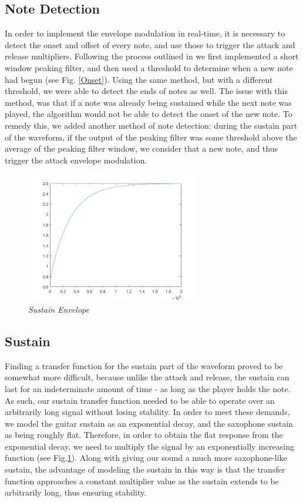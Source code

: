 \documentclass[twoside,a4paper]{article}
\begin{document}
\subsection{Note Detection}
In order to implement the envelope modulation in real-time, it is necessary to detect
the onset and offset of every note, and use those to trigger the attack
and release multipliers. Following the process outlined in \cite{NoteOnset}
we first implemented a short window peaking filter, and then used a threshold
to determine when a new note had begun (see Fig. \ref{Onset}). Using the same method,
but with a different threshold, we were able to detect the ends of notes as well.
The issue with this method, was that if a note was already being sustained while
the next note was played, the algorithm would not be able to detect the onset of
the new note. To remedy this, we added another method of note detection: during
the sustain part of the waveform, if the output of the peaking filter was some
threshold above the average of the peaking filter window, we consider that a new
note, and thus trigger the attack envelope modulation.

\begin{figure}[ht]
  \includegraphics[width=3in]{Pictures/Sustain_Env.png}
  \centering
  \caption{\label{Sustain} {\it Sustain Envelope}}
  \centering
  \end{figure}

\subsection{Sustain}
Finding a transfer function for the sustain part of the waveform proved
to be somewhat more difficult, because unlike the attack and release,
the sustain can last for an indeterminate amount of time - as long as
the player holds the note. As such, our sustain transfer function needed
to be able to operate over an arbitrarily long signal without losing
stability. In order to meet these demands, we model the guitar sustain
as an exponential decay, and the saxophone sustain as being roughly flat.
Therefore, in order to obtain the flat response from the exponential decay,
we need to multiply the signal by an exponentially increasing function (see Fig.\ref{Sustain}).
Along with giving our sound a much more saxophone-like sustain, the advantage of
modeling the sustain in this way is that the transfer function approaches a
constant multiplier value as the sustain extends to be
arbitrarily long, thus ensuring stability.
\end{document}
